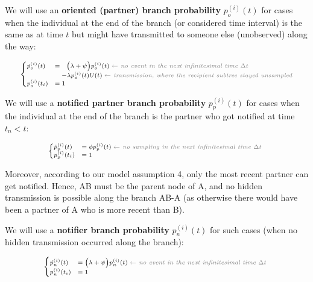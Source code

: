 \documentclass[a4paper,10pt]{article}
\begin{document}
We will use an \textbf{oriented (partner) branch probability} $p_o^{(i)}(t)$ for cases when the individual at the end of the branch (or considered time interval) is the same as at time $t$ but might have transmitted to someone else (unobserved) along the way:

\begin{equation}
\scriptsize
\begin{cases}
\dot{p}_o^{(i)}(t) &=~~  \Big(\lambda + \psi\Big) p_o^{(i)}(t)\; \textit{\color{gray} $\leftarrow$ no event in the next infinitesimal time $\Delta t$ }\\
    &~~~ - \lambda p_o^{(i)}(t)U(t)\;  \textit{\color{gray} $\leftarrow$ transmission, where the recipient subtree stayed unsampled}\\
p_o^{(i)}(t_i) &=  1\label{eq:p-o}
\end{cases}
\end{equation}

We will use a \textbf{notified partner branch probability} $p_p^{(i)}(t)$ for cases when the individual at the end of the branch is the partner who got notified at time $t_n < t$:

\begin{equation}
\scriptsize
\begin{cases}
\dot{p}_p^{(i)}(t) &=  \phi p_p^{(i)}(t)\; \textit{\color{gray} $\leftarrow$ no sampling in the next infinitesimal time $\Delta t$ }\\
p_p^{(i)}(t_i) &=  1\label{eq:p-np}
\end{cases}
\end{equation}

Moreover, according to our model assumption 4, only the most recent partner can get notified. Hence, AB must be the parent node of A, and no hidden transmission is possible along the branch AB-A (as otherwise there would have been a partner of A who is more recent than B).

We will use a \textbf{notifier branch probability} $p_n^{(i)}(t)$ for such cases (when no hidden transmission occurred along the branch):

\begin{equation}
\scriptsize
\begin{cases}
\dot{p}_n^{(i)}(t) &=  \Big(\lambda + \psi\Big) p_n^{(i)}(t)\; \textit{\color{gray} $\leftarrow$ no event in the next infinitesimal time $\Delta t$ }\\
p_n^{(i)}(t_i) &= 1\label{eq:p-nh}
\end{cases}
\end{equation}
\end{document}
